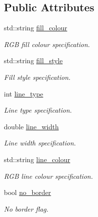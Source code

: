 \subsection*{Public Attributes}
\begin{DoxyCompactItemize}
\item 
\hypertarget{a00429_ab7448164de405d473cf06cca4bb97812}{}std\+::string \hyperlink{a00429_ab7448164de405d473cf06cca4bb97812}{fill\+\_\+colour}\label{a00429_ab7448164de405d473cf06cca4bb97812}

\begin{DoxyCompactList}\small\item\em R\+G\+B fill colour specification. \end{DoxyCompactList}\item 
\hypertarget{a00429_afe5ce4d37cda72ee7e042bfbabf0bd2d}{}std\+::string \hyperlink{a00429_afe5ce4d37cda72ee7e042bfbabf0bd2d}{fill\+\_\+style}\label{a00429_afe5ce4d37cda72ee7e042bfbabf0bd2d}

\begin{DoxyCompactList}\small\item\em Fill style specification. \end{DoxyCompactList}\item 
\hypertarget{a00429_a8250cb269bb7d4861dae6845518aa6df}{}int \hyperlink{a00429_a8250cb269bb7d4861dae6845518aa6df}{line\+\_\+type}\label{a00429_a8250cb269bb7d4861dae6845518aa6df}

\begin{DoxyCompactList}\small\item\em Line type specification. \end{DoxyCompactList}\item 
\hypertarget{a00429_a0f65bd43af5f7b207b6d984f5db60bb0}{}double \hyperlink{a00429_a0f65bd43af5f7b207b6d984f5db60bb0}{line\+\_\+width}\label{a00429_a0f65bd43af5f7b207b6d984f5db60bb0}

\begin{DoxyCompactList}\small\item\em Line width specification. \end{DoxyCompactList}\item 
\hypertarget{a00429_a6723e01a096531cca1e874ce900d4354}{}std\+::string \hyperlink{a00429_a6723e01a096531cca1e874ce900d4354}{line\+\_\+colour}\label{a00429_a6723e01a096531cca1e874ce900d4354}

\begin{DoxyCompactList}\small\item\em R\+G\+B line colour specification. \end{DoxyCompactList}\item 
\hypertarget{a00429_a4df93703247f88e98a87006a2abeb597}{}bool \hyperlink{a00429_a4df93703247f88e98a87006a2abeb597}{no\+\_\+border}\label{a00429_a4df93703247f88e98a87006a2abeb597}

\begin{DoxyCompactList}\small\item\em No border flag. \end{DoxyCompactList}\end{DoxyCompactItemize}


